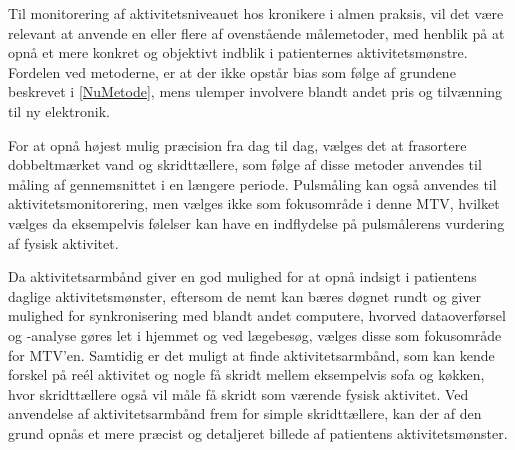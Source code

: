 Til monitorering af aktivitetsniveauet hos kronikere i almen praksis, vil det være relevant at anvende en eller flere af ovenstående målemetoder, med henblik på at opnå et mere konkret og objektivt indblik i patienternes aktivitetsmønstre. Fordelen ved metoderne, er at der ikke opstår bias som følge af grundene beskrevet i \autoref{NuMetode}, mens ulemper involvere blandt andet pris og tilvænning til ny elektronik. 

For at opnå højest mulig præcision fra dag til dag, vælges det at frasortere dobbeltmærket vand og skridttællere, som følge af disse metoder anvendes til måling af gennemsnittet i en længere periode. Pulsmåling kan også anvendes til aktivitetsmonitorering, men vælges ikke som fokusområde i denne MTV, hvilket vælges da eksempelvis følelser kan have en indflydelse på pulsmålerens vurdering af fysisk aktivitet. 

Da aktivitetsarmbånd giver en god mulighed for at opnå indsigt i patientens daglige aktivitetsmønster, eftersom de nemt kan bæres døgnet rundt og giver mulighed for synkronisering med blandt andet computere, hvorved dataoverførsel og -analyse gøres let i hjemmet og ved lægebesøg, vælges disse som fokusområde for MTV'en. Samtidig er det muligt at finde aktivitetsarmbånd, som kan kende forskel på reél aktivitet og nogle få skridt mellem eksempelvis sofa og køkken, hvor skridttællere også vil måle få skridt som værende fysisk aktivitet. Ved anvendelse af aktivitetsarmbånd frem for simple skridttællere, kan der af den grund opnås et mere præcist og detaljeret billede af patientens aktivitetsmønster.





